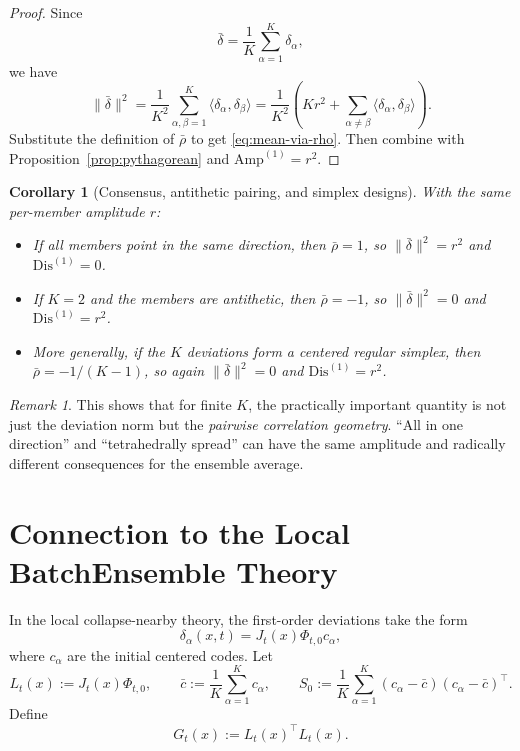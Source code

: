 \documentclass[11pt]{article}
\newtheorem{corollary}[theorem]{Corollary}
\theoremstyle{remark}
\newtheorem{remark}[theorem]{Remark}
\begin{document}
\begin{proof}
Since
\[
\bar\delta=\frac1K\sum_{\alpha=1}^K \delta_\alpha,
\]
we have
\[
\|\bar\delta\|^2
=
\frac{1}{K^2}
\sum_{\alpha,\beta=1}^K \langle \delta_\alpha,\delta_\beta\rangle
=
\frac{1}{K^2}
\left(
Kr^2 + \sum_{\alpha\neq\beta}\langle \delta_\alpha,\delta_\beta\rangle
\right).
\]
Substitute the definition of $\bar\rho$ to get \eqref{eq:mean-via-rho}. Then combine with Proposition~\ref{prop:pythagorean} and $\mathrm{Amp}^{(1)}=r^2$.
\end{proof}

\begin{corollary}[Consensus, antithetic pairing, and simplex designs]
\label{cor:geometry-examples}
With the same per-member amplitude $r$:
\begin{itemize}
\item If all members point in the same direction, then $\bar\rho=1$, so $\|\bar\delta\|^2=r^2$ and $\mathrm{Dis}^{(1)}=0$.
\item If $K=2$ and the members are antithetic, then $\bar\rho=-1$, so $\|\bar\delta\|^2=0$ and $\mathrm{Dis}^{(1)}=r^2$.
\item More generally, if the $K$ deviations form a centered regular simplex, then $\bar\rho=-1/(K-1)$, so again $\|\bar\delta\|^2=0$ and $\mathrm{Dis}^{(1)}=r^2$.
\end{itemize}
\end{corollary}

\begin{remark}
This shows that for finite $K$, the practically important quantity is not just the deviation norm but the \emph{pairwise correlation geometry}. ``All in one direction'' and ``tetrahedrally spread'' can have the same amplitude and radically different consequences for the ensemble average.
\end{remark}

\section{Connection to the Local BatchEnsemble Theory}

In the local collapse-nearby theory, the first-order deviations take the form
\[
\delta_\alpha(x,t) = J_t(x)\Phi_{t,0} c_\alpha,
\]
where $c_\alpha$ are the initial centered codes. Let
\[
L_t(x):=J_t(x)\Phi_{t,0},
\qquad
\bar c := \frac1K\sum_{\alpha=1}^K c_\alpha,
\qquad
S_0 := \frac1K\sum_{\alpha=1}^K (c_\alpha-\bar c)(c_\alpha-\bar c)^\top.
\]
Define
\[
G_t(x):=L_t(x)^\top L_t(x).
\]
\end{document}
